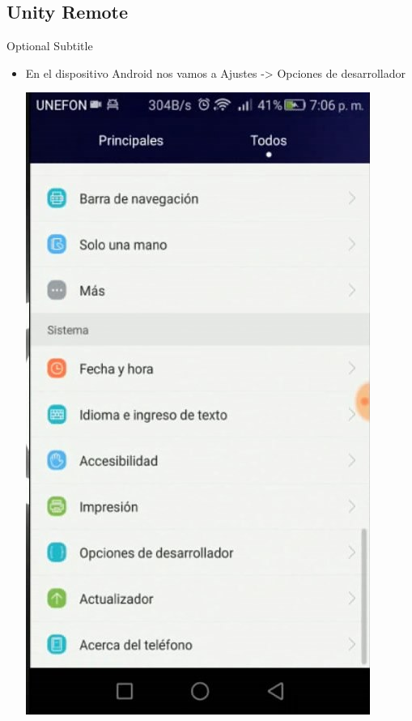 \documentclass{beamer}
\begin{document}
\subsection{Unity Remote}

\begin{frame}{01}{Optional Subtitle}
  \begin{itemize}
  \item {
    En el dispositivo Android nos vamos a
    Ajustes -> Opciones de desarrollador
    
  }
  
  \includegraphics[height=0.7\paperheight]{image2/UR01}
  \centering
  \end{itemize}
\end{frame}
\end{document}
